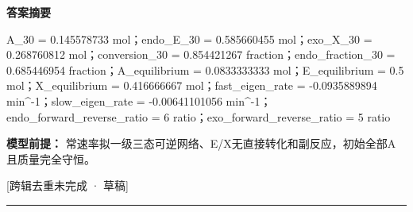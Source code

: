 \documentclass[UTF8,11pt,a4paper]{ctexart}
\begin{document}
\noindent\textbf{答案摘要}\par
A\_30 = 0.145578733 mol；endo\_E\_30 = 0.585660455 mol；exo\_X\_30 = 0.268760812 mol；conversion\_30 = 0.854421267 fraction；endo\_fraction\_30 = 0.685446954 fraction；A\_equilibrium = 0.0833333333 mol；E\_equilibrium = 0.5 mol；X\_equilibrium = 0.416666667 mol；fast\_eigen\_rate = -0.0935889894 min\textasciicircum{}-1；slow\_eigen\_rate = -0.00641101056 min\textasciicircum{}-1；endo\_forward\_reverse\_ratio = 6 ratio；exo\_forward\_reverse\_ratio = 5 ratio\par
\noindent\textbf{模型前提：}
常速率拟一级三态可逆网络、E/X无直接转化和副反应，初始全部A且质量完全守恒。\par
\noindent\textcolor{red!65!black}{[跨辑去重未完成 · 草稿]} \par
\medskip\hrule\medskip
{}
\end{document}
